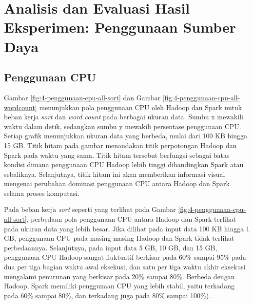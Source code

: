 
\newpage
\section{Analisis dan Evaluasi Hasil Eksperimen: Penggunaan Sumber Daya}
\subsection{Penggunaan CPU}
Gambar \ref{fig:4-penggunaan-cpu-all-sort} dan Gambar \ref{fig:4-penggunaan-cpu-all-wordcount} menunjukkan pola penggunaan CPU oleh Hadoop dan Spark untuk beban kerja \textit{sort} dan \textit{word count} pada berbagai ukuran data. Sumbu x mewakili waktu dalam detik, sedangkan sumbu y mewakili persentase penggunaan CPU. Setiap grafik menunjukkan ukuran data yang berbeda, mulai dari 100 KB hingga 15 GB. Titik hitam pada gambar menandakan titik perpotongan Hadoop dan Spark pada waktu yang sama. Titik hitam tersebut berfungsi sebagai batas kondisi dimana penggunaan CPU Hadoop lebih tinggi dibandingkan Spark atau sebaliknya. Selanjutnya, titik hitam ini akan memberikan informasi visual mengenai perubahan dominasi penggunaan CPU antara Hadoop dan Spark selama proses komputasi.

Pada beban kerja \textit{sort} seperti yang terlihat pada Gambar \ref{fig:4-penggunaan-cpu-all-sort}, perbedaan pola penggunaan CPU antara Hadoop dan Spark terlihat pada ukuran data yang lebih besar. Jika dilihat pada input data 100 KB hingga 1 GB, penggunaan CPU pada masing-masing Hadoop dan Spark tidak terlihat perbedaannya. Selanjutnya, pada input data 5 GB, 10 GB, dan 15 GB, penggunaan CPU Hadoop sangat fluktuatif berkisar pada 60\% sampai 95\% pada dua per tiga bagian waktu awal eksekusi, dan satu per tiga waktu akhir eksekusi mengalami penurunan yang berkisar pada 20\% sampai 80\%. Berbeda dengan Hadoop, Spark memiliki penggunaan CPU yang lebih stabil, yaitu terkadang pada 60\% sampai 80\%, dan terkadang juga pada 80\% sampai 100\%).

